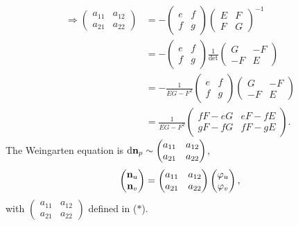 \begin{align*}
    \Rightarrow
    \begin{pmatrix}
        a_{11}&a_{12}\\
        a_{21}&a_{22}
    \end{pmatrix}
    &=-\begin{pmatrix}
        e&f\\
        f&g
    \end{pmatrix}
    \begin{pmatrix}
        E&F\\
        F&G
    \end{pmatrix}^{-1}\\
    &=-\begin{pmatrix}
        e&f\\
        f&g
    \end{pmatrix}
    \frac{1}{\det}\begin{pmatrix}
        G&-F\\
        -F&E
    \end{pmatrix}\\
    &=-\frac{1}{EG-F^2}\begin{pmatrix}
        e&f\\
        f&g
    \end{pmatrix}
    \begin{pmatrix}
        G&-F\\
        -F&E
    \end{pmatrix}\\
    &=\frac{1}{EG-F^2}\begin{pmatrix}
        fF-eG& e F-fE\\
        gF-fG& fF-gE
    \end{pmatrix}\tag{\(\ast \)}.
\end{align*}
The Weingarten equation is \(\dd\vb{n}_p\sim \begin{pmatrix}
    a_{11}&a_{12}\\
    a_{21}&a_{22}
\end{pmatrix}\),
\ie\ 
\[
    \begin{pmatrix}
        \vb{n}_u\\
        \vb{n}_v
    \end{pmatrix}=
    \begin{pmatrix}
        a_{11}&a_{12}\\
        a_{21}&a_{22}
    \end{pmatrix}
    \begin{pmatrix}
        \varphi_u\\
        \varphi_v
    \end{pmatrix},
\]
with \(\begin{pmatrix}
    a_{11}&a_{12}\\
    a_{21}&a_{22}
\end{pmatrix}\) defined in (\(\ast\)).

